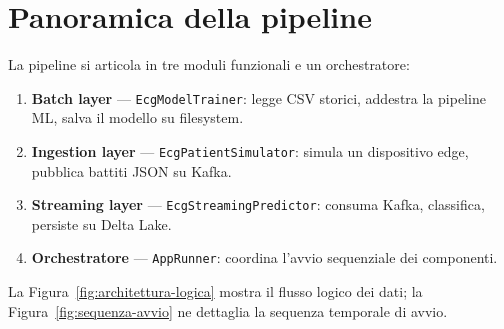 \section{Panoramica della pipeline}\label{sec:panoramica-pipeline}

La pipeline si articola in tre moduli funzionali e un orchestratore:

\begin{enumerate}
  \item \textbf{Batch layer} --- \texttt{EcgModelTrainer}: legge CSV storici, addestra la pipeline ML, salva il modello su filesystem.
  \item \textbf{Ingestion layer} --- \texttt{EcgPatientSimulator}: simula un dispositivo edge, pubblica battiti JSON su Kafka.
  \item \textbf{Streaming layer} --- \texttt{EcgStreamingPredictor}: consuma Kafka, classifica, persiste su Delta Lake.
  \item \textbf{Orchestratore} --- \texttt{AppRunner}: coordina l'avvio sequenziale dei componenti.
\end{enumerate}

La Figura~\ref{fig:architettura-logica} mostra il flusso logico dei dati; la Figura~\ref{fig:sequenza-avvio} ne dettaglia la sequenza temporale di avvio.

